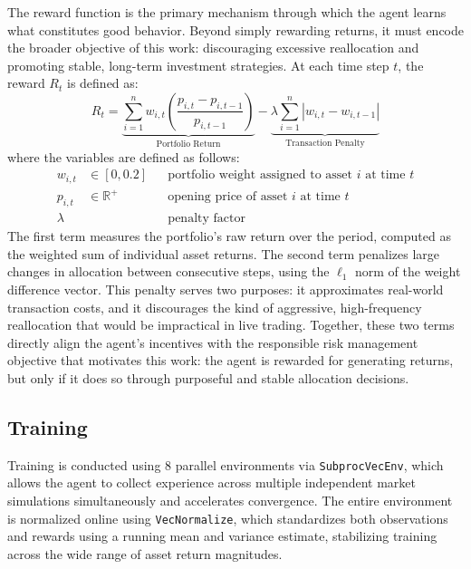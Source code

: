 \documentclass[final]{article}
\begin{document}
The reward function is the primary mechanism through which the agent learns what constitutes good behavior. Beyond
simply rewarding returns, it must encode the broader objective of this work: discouraging excessive reallocation and
promoting stable, long-term investment strategies. At each time step $t$, the reward $R_t$ is defined as:
\begin{equation}
    R_t = \underbrace{\sum_{i=1}^{n} w_{i,t} \left( \frac{p_{i,t} - p_{i,t-1}}{p_{i,t-1}} \right)}_{\text{Portfolio Return}} - \underbrace{\lambda \sum_{i=1}^{n} |w_{i,t} - w_{i,t-1}|}_{\text{Transaction Penalty}}
\end{equation}
where the variables are defined as follows:
\begin{align*}
    w_{i,t} &\in [0, 0.2] && \text{portfolio weight assigned to asset } i
                              \text{ at time } t \\
    p_{i,t} &\in \mathbb{R}^+ && \text{opening price of asset } i
                                  \text{ at time } t \\
    \lambda &&& \text{penalty factor}
\end{align*}
The first term measures the portfolio's raw return over the period, computed as the weighted sum of individual asset
returns. The second term penalizes large changes in allocation between consecutive steps, using the $\ell_1$ norm of
the weight difference vector. This penalty serves two purposes: it approximates real-world transaction costs, and it
discourages the kind of aggressive, high-frequency reallocation that would be impractical in live trading. Together,
these two terms directly align the agent's incentives with the responsible risk management objective that motivates
this work: the agent is rewarded for generating returns, but only if it does so through purposeful and stable
allocation decisions.

\subsection{Training}
\label{sec:training}
Training is conducted using 8 parallel environments via \texttt{SubprocVecEnv}, which allows the agent to collect
experience across multiple independent market simulations simultaneously and accelerates convergence. The entire
environment is normalized online using \texttt{VecNormalize}, which standardizes both observations and rewards using a
running mean and variance estimate, stabilizing training across the wide range of asset return magnitudes.
\end{document}
